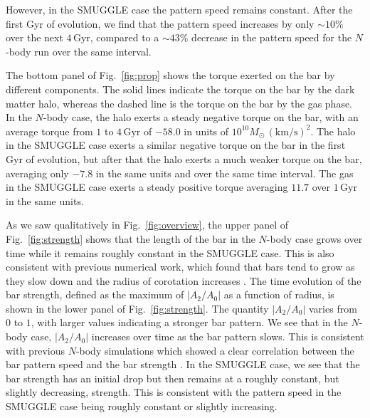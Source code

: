 \documentclass[fleqn,usenatbib]{mnras}
\newcommand{\Nbody}{$N$-body}
\begin{document}
However, in the SMUGGLE case the pattern speed remains constant. After the first
Gyr of evolution, we find that the pattern speed increases by only $\sim10\%$
over the next $4\,\textrm{Gyr}$, compared to a $\sim43\%$ decrease in the
pattern speed for the \Nbody{} run over the same interval.

The bottom panel of Fig.~\ref{fig:prop} shows the torque exerted on the bar by
different components. The solid lines indicate the torque on the bar by the dark
matter halo, whereas the dashed line is the torque on the bar by the gas phase.
In the \Nbody{} case, the halo exerts a steady negative torque on the bar, with
an average torque from $1$ to $4\,\textrm{Gyr}$ of $-58.0$ in units of
$10^{10}M_{\odot}\,(\textrm{km}/\textrm{s})^2$. The halo in the SMUGGLE case
exerts a similar negative torque on the bar in the first Gyr of evolution, but
after that the halo exerts a much weaker torque on the bar, averaging only
$-7.8$ in the same units and over the same time interval. The gas in the SMUGGLE
case exerts a steady positive torque averaging $11.7$ over $1\,\textrm{Gyr}$ in
the same units.

As we saw qualitatively in Fig.~\ref{fig:overview}, the upper panel of
Fig.~\ref{fig:strength} shows that the length of the bar in the \Nbody{} case
grows over time while it remains roughly constant in the SMUGGLE case. This is
also consistent with previous numerical work, which found that bars tend to grow
as they slow down and the radius of corotation increases
\citep{2000ApJ...543..704D, 2003MNRAS.341.1179A}. The time evolution of the bar
strength, defined as the maximum of $\left|A_2/A_0\right|$ as a function of
radius, is shown in the lower panel of Fig.~\ref{fig:strength}. The quantity
$\left|A_2/A_0\right|$ varies from $0$ to $1$, with larger values indicating a
stronger bar pattern. We see that in the \Nbody{} case, $\left|A_2/A_0\right|$
increases over time as the bar pattern slows. This is consistent with previous
\Nbody{} simulations which showed a clear correlation between the bar pattern
speed and the bar strength \citep[e.g.,][]{2003MNRAS.341.1179A}. In the SMUGGLE
case, we see that the bar strength has an initial drop but then remains at a
roughly constant, but slightly decreasing, strength. This is consistent with the
pattern speed in the SMUGGLE case being roughly constant or slightly increasing.


\end{document}
